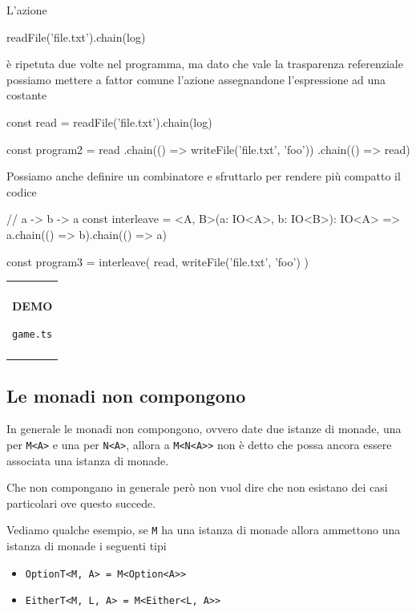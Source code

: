 \documentclass[12pt]{article}
\theoremstyle{definition}
\newenvironment{demo}
    {\begin{center}
    \begin{tabular}{|p{0.9\textwidth}|}
    \hline\\
    }
    {
    \\\\\hline
    \end{tabular}
    \end{center}
    }
\newenvironment{code}
  {\vspace{0.5cm} \VerbatimEnvironment\begin{typescriptcode}}
  {\end{typescriptcode} \vspace{0.2cm}}
\begin{document}
L'azione

\begin{code}
readFile('file.txt').chain(log)
\end{code}

è ripetuta due volte nel programma, ma dato che vale la trasparenza referenziale
possiamo mettere a fattor comune l'azione assegnandone l'espressione ad una costante

\begin{code}
const read = readFile('file.txt').chain(log)

const program2 = read
  .chain(() => writeFile('file.txt', 'foo'))
  .chain(() => read)
\end{code}

Possiamo anche definire un combinatore e sfruttarlo per rendere più compatto il codice

\begin{code}
// a -> b -> a
const interleave = <A, B>(a: IO<A>, b: IO<B>): IO<A> =>
  a.chain(() => b).chain(() => a)

const program3 = interleave(
  read,
  writeFile('file.txt', 'foo')
)
\end{code}

\begin{demo}
\begin{center}
\textbf{DEMO}

\texttt{game.ts}
\end{center}
\end{demo}

\subsection{Le monadi non compongono}

In generale le monadi non compongono, ovvero date due istanze di monade, una per \texttt{M<A>} e una per \texttt{N<A>},
allora a \texttt{M<N<A>>} non è detto che possa ancora essere associata una istanza di monade.

Che non compongano in generale però non vuol dire che non esistano dei casi particolari ove questo succede.

Vediamo qualche esempio, se \texttt{M} ha una istanza di monade allora ammettono una istanza di monade i seguenti tipi

\begin{itemize}
  \item \texttt{OptionT<M, A> = M<Option<A>>}
  \item \texttt{EitherT<M, L, A> = M<Either<L, A>>}
\end{itemize}
\end{document}
